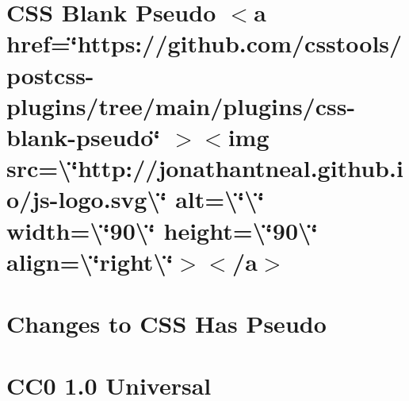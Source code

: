 \documentclass[twoside]{book}
\newcommand{\+}{\discretionary{\mbox{\scriptsize$\hookleftarrow$}}{}{}}
\begin{document}
\chapter{CSS Blank Pseudo \texorpdfstring{$<$}{<}a href=\char`\"{}https\+://github.\+com/csstools/postcss-\/plugins/tree/main/plugins/css-\/blank-\/pseudo\char`\"{} \texorpdfstring{$>$}{>}\texorpdfstring{$<$}{<}img src=\textbackslash{}\char`\"{}http\+://jonathantneal.\+github.\+io/js-\/logo.\+svg\textbackslash{}\char`\"{} alt=\textbackslash{}\char`\"{}\textbackslash{}\char`\"{} width=\textbackslash{}\char`\"{}90\textbackslash{}\char`\"{} height=\textbackslash{}\char`\"{}90\textbackslash{}\char`\"{} align=\textbackslash{}\char`\"{}right\textbackslash{}\char`\"{}\texorpdfstring{$>$}{>}\texorpdfstring{$<$}{<}/a\texorpdfstring{$>$}{>}}
\label{md__c___users_vaishnavi_jadhav__desktop__developer_code_mean_stack_example_client_node_modules_css_blank_pseudo__r_e_a_d_m_e}

\chapter{Changes to CSS Has Pseudo}
\label{md__c___users_vaishnavi_jadhav__desktop__developer_code_mean_stack_example_client_node_modules_c78b8580de8dfdb99815474b9eb3d2dc7}

\chapter{CC0 1.0 Universal}
\label{md__c___users_vaishnavi_jadhav__desktop__developer_code_mean_stack_example_client_node_modules_css_has_pseudo__l_i_c_e_n_s_e}

\end{document}
